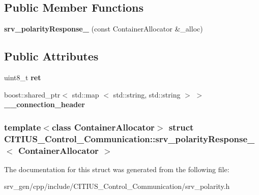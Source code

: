 \subsection*{\-Public \-Member \-Functions}
\begin{DoxyCompactItemize}
\item 
\hypertarget{struct_c_i_t_i_u_s___control___communication_1_1srv__polarity_response___a81a728c34051c48ee50831b1f27f86ee}{{\bfseries srv\-\_\-polarity\-Response\-\_\-} (const \-Container\-Allocator \&\-\_\-alloc)}\label{struct_c_i_t_i_u_s___control___communication_1_1srv__polarity_response___a81a728c34051c48ee50831b1f27f86ee}

\end{DoxyCompactItemize}
\subsection*{\-Public \-Attributes}
\begin{DoxyCompactItemize}
\item 
\hypertarget{struct_c_i_t_i_u_s___control___communication_1_1srv__polarity_response___a686535daeefe53c8aaaf51ebfa36a594}{uint8\-\_\-t {\bfseries ret}}\label{struct_c_i_t_i_u_s___control___communication_1_1srv__polarity_response___a686535daeefe53c8aaaf51ebfa36a594}

\item 
\hypertarget{struct_c_i_t_i_u_s___control___communication_1_1srv__polarity_response___a74aa076e020ee6a17b0c0201b4ed82f1}{boost\-::shared\-\_\-ptr$<$ std\-::map\*
$<$ std\-::string, std\-::string $>$ $>$ {\bfseries \-\_\-\-\_\-connection\-\_\-header}}\label{struct_c_i_t_i_u_s___control___communication_1_1srv__polarity_response___a74aa076e020ee6a17b0c0201b4ed82f1}

\end{DoxyCompactItemize}
\subsubsection*{template$<$class Container\-Allocator$>$ struct C\-I\-T\-I\-U\-S\-\_\-\-Control\-\_\-\-Communication\-::srv\-\_\-polarity\-Response\-\_\-$<$ Container\-Allocator $>$}



\-The documentation for this struct was generated from the following file\-:\begin{DoxyCompactItemize}
\item 
srv\-\_\-gen/cpp/include/\-C\-I\-T\-I\-U\-S\-\_\-\-Control\-\_\-\-Communication/srv\-\_\-polarity.\-h\end{DoxyCompactItemize}
